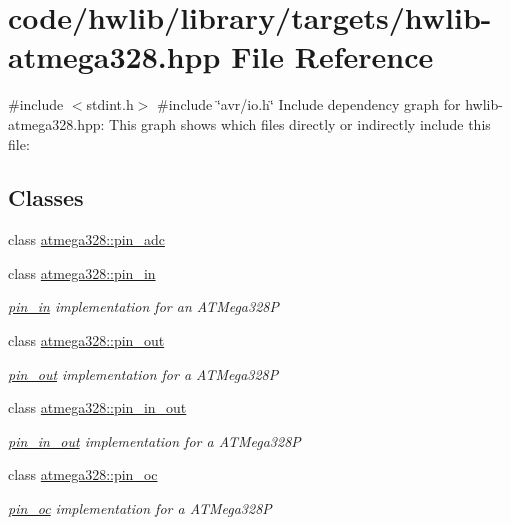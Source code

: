 \hypertarget{hwlib-atmega328_8hpp}{}\section{code/hwlib/library/targets/hwlib-\/atmega328.hpp File Reference}
\label{hwlib-atmega328_8hpp}
{\ttfamily \#include $<$stdint.\+h$>$}\newline
{\ttfamily \#include \char`\"{}avr/io.\+h\char`\"{}}\newline
Include dependency graph for hwlib-\/atmega328.hpp\+:
This graph shows which files directly or indirectly include this file\+:
\subsection*{Classes}
\begin{DoxyCompactItemize}
\item 
class \hyperlink{classatmega328_1_1pin__adc}{atmega328\+::pin\+\_\+adc}
\item 
class \hyperlink{classatmega328_1_1pin__in}{atmega328\+::pin\+\_\+in}
\begin{DoxyCompactList}\small\item\em \hyperlink{classatmega328_1_1pin__in}{pin\+\_\+in} implementation for an A\+T\+Mega328P \end{DoxyCompactList}\item 
class \hyperlink{classatmega328_1_1pin__out}{atmega328\+::pin\+\_\+out}
\begin{DoxyCompactList}\small\item\em \hyperlink{classatmega328_1_1pin__out}{pin\+\_\+out} implementation for a A\+T\+Mega328P \end{DoxyCompactList}\item 
class \hyperlink{classatmega328_1_1pin__in__out}{atmega328\+::pin\+\_\+in\+\_\+out}
\begin{DoxyCompactList}\small\item\em \hyperlink{classatmega328_1_1pin__in__out}{pin\+\_\+in\+\_\+out} implementation for a A\+T\+Mega328P \end{DoxyCompactList}\item 
class \hyperlink{classatmega328_1_1pin__oc}{atmega328\+::pin\+\_\+oc}
\begin{DoxyCompactList}\small\item\em \hyperlink{classatmega328_1_1pin__oc}{pin\+\_\+oc} implementation for a A\+T\+Mega328P \end{DoxyCompactList}\end{DoxyCompactItemize}
